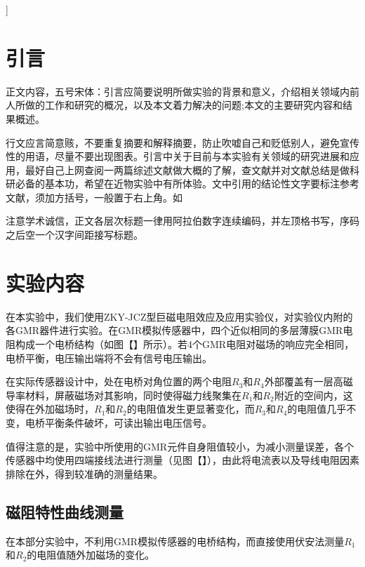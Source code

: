 \documentclass{thuemp}
\begin{document}
]
\wuhao 

\section{引言}
\enlargethispage{-3.3cm}
正文内容，五号宋体：引言应简要说明所做实验的背景和意义，介绍相关领域内前人所做的工作和研究的概况，以及本文着力解决的问题;本文的主要研究内容和结果概述。

行文应言简意赅，不要重复摘要和解释摘要，防止吹嘘自己和贬低别人，避免宣传性的用语，尽量不要出现图表。引言中关于目前与本实验有关领域的研究进展和应用，最好自己上网查阅一两篇综述文献做大概的了解，查文献并对文献总结是做科研必备的基本功，希望在近物实验中有所体验。文中引用的结论性文字要标注参考文献，须加方括号，一般置于右上角。如\cite{王合英2008磁控溅射镀膜过程中非均匀磁场中电子的运动, 王合英2018自主探究实验对学生综合素质和创新能力的培养}

注意学术诚信，正文各层次标题一律用阿拉伯数字连续编码，并左顶格书写，序码之后空一个汉字间距接写标题。


\section{实验内容}

在本实验中，我们使用ZKY-JCZ型巨磁电阻效应及应用实验仪，对实验仪内附的各GMR器件进行实验。在GMR模拟传感器中，四个近似相同的多层薄膜GMR电阻构成一个电桥结构（如图【】所示）。若4个GMR电阻对磁场的响应完全相同，电桥平衡，电压输出端将不会有信号电压输出。

在实际传感器设计中，处在电桥对角位置的两个电阻$R_3$和$R_4$外部覆盖有一层高磁导率材料，屏蔽磁场对其影响，同时使得磁力线聚集在$R_1$和$R_2$附近的空间内，这使得在外加磁场时，$R_1$和$R_2$的电阻值发生更显著变化，而$R_3$和$R_4$的电阻值几乎不变，电桥平衡条件破坏，可读出输出电压信号。

值得注意的是，实验中所使用的GMR元件自身阻值较小，为减小测量误差，各个传感器中均使用四端接线法进行测量（见图【】），由此将电流表以及导线电阻因素排除在外，得到较准确的测量结果。

\subsection{磁阻特性曲线测量}

在本部分实验中，不利用GMR模拟传感器的电桥结构，而直接使用伏安法测量$R_1$和$R_2$的电阻值随外加磁场的变化。
\end{document}
